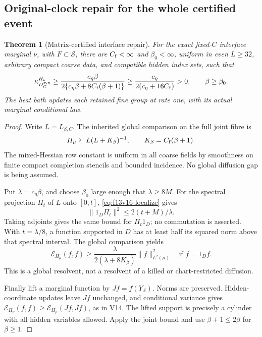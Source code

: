 \documentclass[11pt,oneside]{article}
\newtheorem{theorem}{Theorem}[section]
\begin{document}
\subsection{Original-clock repair for the whole certified event}

\begin{theorem}[Matrix-certified interface repair]
\label{thm:f13v16-repair}
For the exact fixed-\(C\) interface marginal \(\nu\),
with \(F\subset\mathcal S\), there are
\(C_{\rm f}<\infty\) and \(\beta_0<\infty\),
uniform in even \(L\ge32\), arbitrary compact
coarse data, and compatible hidden index sets, such that
\[
 \kappa_{D_C^{\sigma,\eta}}^{H_\nu}
 \ge\frac{c_\eta\beta}
           {2\{c_\eta\beta+8C_{\rm f}(\beta+1)\}}
 \ge\frac{c_\eta}{2(c_\eta+16C_{\rm f})}>0,
 \qquad \beta\ge\beta_0 .
\]
The heat bath updates each retained fine group at
rate one, with its actual marginal conditional law.
\end{theorem}

\begin{proof}
Write \(L=L_{\beta,C}\). The inherited global
comparison on the full joint fibre is
\[
 H_\mu\succeq L(L+K_\beta)^{-1},
                  \qquad K_\beta=C_{\rm f}(\beta+1).
\]
The mixed-Hessian row constant is uniform in all
coarse fields by smoothness on finite compact
completion stencils and bounded incidence.
No global diffusion gap is being assumed.

Put \(\lambda=c_\eta\beta\), and choose
\(\beta_0\) large enough that \(\lambda\ge8M\).
For the spectral projection \(\Pi_t\) of \(L\)
onto \([0,t]\), \eqref{eq:f13v16-localize} gives
\[
            \|1_D\Pi_t\|^2\le2(t+M)/\lambda.
\]
Taking adjoints gives the same bound for
\(\Pi_t1_D\); no commutation is asserted.
With \(t=\lambda/8\), a function supported in
\(D\) has at least half its squared norm above
that spectral interval. The global comparison yields
\[
 \mathcal E_{H_\mu}(f,f)
                  \ge\frac{\lambda}{2(\lambda+8K_\beta)}
                                      \|f\|_{L^2(\mu)}^2
                  \quad\text{if }f=1_Df .
\]
This is a global resolvent, not a resolvent of a
killed or chart-restricted diffusion.

Finally lift a marginal function by \(Jf=f(Y_{\mathcal S})\).
Norms are preserved. Hidden-coordinate updates leave
\(Jf\) unchanged, and conditional variance gives
\(\mathcal E_{H_\nu}(f,f)\ge
\mathcal E_{H_\mu}(Jf,Jf)\), as in V14.
The lifted support is precisely a cylinder with
all hidden variables allowed. Apply the joint
bound and use \(\beta+1\le2\beta\) for \(\beta\ge1\).
\end{proof}
\end{document}
